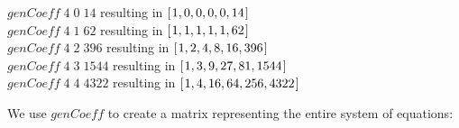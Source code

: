\documentclass[tikz]{scrreprt}
\newcommand{\Varid}[1]{\mathit{#1}}
\begin{document}
\begin{minipage}{\textwidth}
\ensuremath{\Varid{genCoeff}\;\mathrm{4}\;\mathrm{0}\;\mathrm{14}} resulting in \ensuremath{[\mskip1.5mu \mathrm{1},\mathrm{0},\mathrm{0},\mathrm{0},\mathrm{0},\mathrm{14}\mskip1.5mu]}\\
\ensuremath{\Varid{genCoeff}\;\mathrm{4}\;\mathrm{1}\;\mathrm{62}} resulting in \ensuremath{[\mskip1.5mu \mathrm{1},\mathrm{1},\mathrm{1},\mathrm{1},\mathrm{1},\mathrm{62}\mskip1.5mu]}\\
\ensuremath{\Varid{genCoeff}\;\mathrm{4}\;\mathrm{2}\;\mathrm{396}} resulting in \ensuremath{[\mskip1.5mu \mathrm{1},\mathrm{2},\mathrm{4},\mathrm{8},\mathrm{16},\mathrm{396}\mskip1.5mu]}\\
\ensuremath{\Varid{genCoeff}\;\mathrm{4}\;\mathrm{3}\;\mathrm{1544}} resulting in \ensuremath{[\mskip1.5mu \mathrm{1},\mathrm{3},\mathrm{9},\mathrm{27},\mathrm{81},\mathrm{1544}\mskip1.5mu]}\\
\ensuremath{\Varid{genCoeff}\;\mathrm{4}\;\mathrm{4}\;\mathrm{4322}} resulting in \ensuremath{[\mskip1.5mu \mathrm{1},\mathrm{4},\mathrm{16},\mathrm{64},\mathrm{256},\mathrm{4322}\mskip1.5mu]}
\end{minipage}

We use \ensuremath{\Varid{genCoeff}} to create a matrix representing
the entire system of equations:
\end{document}
